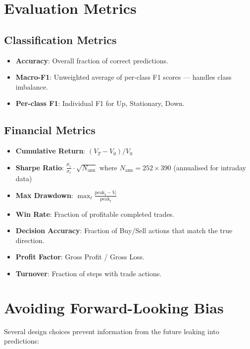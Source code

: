 \documentclass[12pt, a4paper]{article}
\begin{document}
\section{Evaluation Metrics}

\subsection{Classification Metrics}
\begin{itemize}
  \item \textbf{Accuracy}: Overall fraction of correct predictions.
  \item \textbf{Macro-F1}: Unweighted average of per-class F1 scores — handles class imbalance.
  \item \textbf{Per-class F1}: Individual F1 for Up, Stationary, Down.
\end{itemize}

\subsection{Financial Metrics}
\begin{itemize}
  \item \textbf{Cumulative Return}: $(V_T - V_0) / V_0$
  \item \textbf{Sharpe Ratio}: $\frac{\mu_r}{\sigma_r} \cdot \sqrt{N_{\text{ann}}}$ where $N_{\text{ann}} = 252 \times 390$ (annualised for intraday data)
  \item \textbf{Max Drawdown}: $\max_t \frac{\text{peak}_t - V_t}{\text{peak}_t}$
  \item \textbf{Win Rate}: Fraction of profitable completed trades.
  \item \textbf{Decision Accuracy}: Fraction of Buy/Sell actions that match the true direction.
  \item \textbf{Profit Factor}: Gross Profit / Gross Loss.
  \item \textbf{Turnover}: Fraction of steps with trade actions.
\end{itemize}

\section{Avoiding Forward-Looking Bias}

Several design choices prevent information from the future leaking into predictions:
\end{document}
